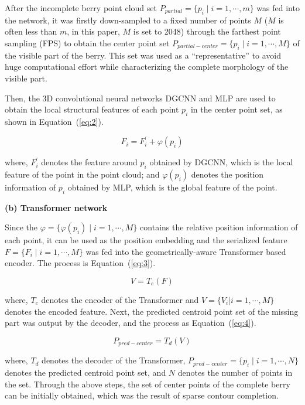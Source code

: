 \documentclass[12pt]{article}
\begin{document}
After the incomplete berry point cloud set $P_{partial}=\{p_i \mid i=1,\cdots,m\}$ was fed into the network, it was firstly down-sampled to a fixed number of points $M$ ($M$ is often less than $m$, in this paper, $M$ is set to 2048) through the farthest point sampling (FPS) to obtain the center point set $P_{partial-center}=\{p_i \mid i=1, \cdots, M\}$ of the visible part of the berry. 
This set was used as a ``representative'' to avoid huge computational effort while characterizing the complete morphology of the visible part.

Then, the 3D convolutional neural networks DGCNN \citep{wang_dynamic_2019} and MLP \citep{tolstikhin_mlpmixer_2021} are used to obtain the local structural features of each point $p_i$ in the center point set, as shown in Equation~(\ref{eq:2}).

\begin{equation}
    F_i = F_{i}^{'} + \varphi(p_i)
    \label{eq:2}
\end{equation}

{\raggedright where, $F_{i}^{'}$ denotes the feature around $p_i$ obtained by DGCNN, which is the local feature of the point in the point cloud; and $\varphi(p_i)$ denotes the position information of $p_i$ obtained by MLP, which is the global feature of the point.}

{\raggedright\textbf{(b) Transformer network}}

Since the $\varphi = \{ \varphi(p_i) \mid i=1, \cdots, M \}$ contains the relative position information of each point, it can be used as the position embedding and the serialized feature $F = \{F_i \mid i=1, \cdots, M \}$ was fed into the geometrically-aware Transformer \citep{vaswani_attention_2017} based encoder. 
The process is Equation~(\ref{eq:3}).

\begin{equation}
    V = T_e(F)
    \label{eq:3}
\end{equation}

{\raggedright where, $T_e$ denotes the encoder of the Transformer and $V=\{V_i |i=1, \cdots, M\}$ denotes the encoded feature. 
Next, the predicted centroid point set of the missing part was output by the decoder, and the process as Equation~(\ref{eq:4}).}

\begin{equation}
    P_{pred-center} = T_d(V)
    \label{eq:4}
\end{equation}

{\raggedright where, $T_d$ denotes the decoder of the Transformer, $P_{pred-center}=\{p_i \mid i=1,\cdots,N\}$ denotes the predicted centroid point set, and $N$ denotes the number of points in the set. 
Through the above steps, the set of center points of the complete berry can be initially obtained, which was the result of sparse contour completion.}
\end{document}
